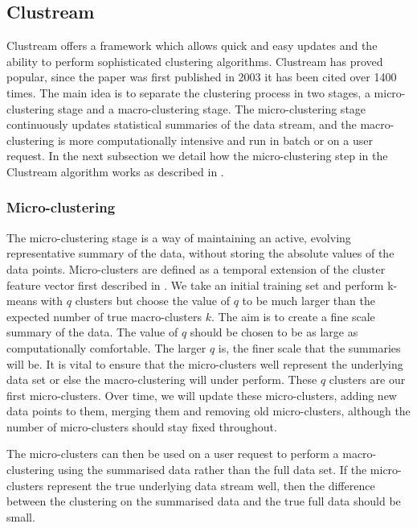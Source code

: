 \subsection{Clustream}

Clustream \citep{Aggarwal2003} offers a framework which allows quick and easy updates and the ability to perform sophisticated clustering algorithms. Clustream has proved popular, since the paper was first published in 2003 it has been cited over 1400 times. The main idea is to separate the clustering process in two stages, a micro-clustering stage and a macro-clustering stage. The  micro-clustering stage continuously updates statistical summaries of the data stream, and the macro-clustering is more computationally intensive and run in batch or on a user request. In the next subsection we detail how the micro-clustering step in the Clustream algorithm works as described in \cite{Aggarwal2003}.

\subsubsection{Micro-clustering}

The micro-clustering stage is a way of maintaining an active, evolving representative summary of the data, without storing the absolute values of the data points. Micro-clusters are defined as a temporal extension of the cluster feature vector first described in \cite{Zhang1996a}.%
We take an initial training set and perform k-means with $q$ clusters but choose the value of $q$ to be much larger than the expected number of true macro-clusters $k$. The aim is to create a fine scale summary of the data. The value of $q$ should be chosen to be as large as computationally comfortable. The larger $q$ is, the finer scale that the summaries will be. It is vital to ensure that the micro-clusters well represent the underlying data set or else the macro-clustering will under perform. These $q$ clusters are our first micro-clusters. Over time, we will update these micro-clusters, adding new data points to them, merging them and removing old micro-clusters, although the number of micro-clusters should stay fixed throughout. 

The micro-clusters can then be used on a user request to perform a macro-clustering using the summarised data rather than the full data set. If the micro-clusters represent the true underlying data stream well, then the difference between the clustering on the summarised data and the true full data should be small. 

